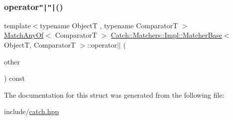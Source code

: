 \mbox{\label{struct_catch_1_1_matchers_1_1_impl_1_1_matcher_base_ae0345ee76d109ac6d0241be261450ebc}} 
\subsubsection{\texorpdfstring{operator\texttt{"|}\texttt{"|}()}{operator||()}}
{\footnotesize\ttfamily template$<$typename ObjectT , typename ComparatorT $>$ \\
\mbox{\hyperlink{struct_catch_1_1_matchers_1_1_impl_1_1_match_any_of}{Match\+Any\+Of}}$<$ ComparatorT $>$ \mbox{\hyperlink{struct_catch_1_1_matchers_1_1_impl_1_1_matcher_base}{Catch\+::\+Matchers\+::\+Impl\+::\+Matcher\+Base}}$<$ ObjectT, ComparatorT $>$\+::operator$\vert$$\vert$ (\begin{DoxyParamCaption}\item[{\mbox{\hyperlink{struct_catch_1_1_matchers_1_1_impl_1_1_matcher_base}{Matcher\+Base}}$<$ ObjectT, ComparatorT $>$ const \&}]{other }\end{DoxyParamCaption}) const}



The documentation for this struct was generated from the following file\+:\begin{DoxyCompactItemize}
\item 
include/\mbox{\hyperlink{catch_8hpp}{catch.\+hpp}}\end{DoxyCompactItemize}
